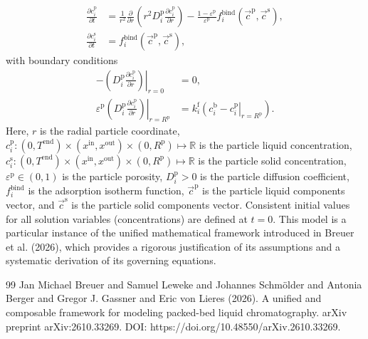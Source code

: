 \documentclass{article}
\begin{document}
\begin{align}
    \frac{\partial c^{\mathrm{p}}_{i}}{\partial t}
    &= \frac{1}{r^{2}} \frac{\partial }{\partial r} \left( r^{2} D^{\mathrm{p}}_{i} \frac{\partial c^{\mathrm{p}}_{i}}{\partial r} \right)
        - \frac{1 - \varepsilon^{\mathrm{p}}}{\varepsilon^{\mathrm{p}}}f^{\mathrm{bind}}_{i}\left( \vec{c}^{\mathrm{p}}, \vec{c}^{\mathrm{s}} \right),
    \\
    \frac{\partial c^{\mathrm{s}}_{i}}{\partial t}
    &= f^{\mathrm{bind}}_{i}\left( \vec{c}^{\mathrm{p}}, \vec{c}^{\mathrm{s}} \right),
\end{align}
with boundary conditions
\begin{align}
    - \left. \left( D^{\mathrm{p}}_{i} \frac{\partial c^{\mathrm{p}}_{i}}{\partial r} \right) \right|_{r=0}
    &= 0,
    \\
    \varepsilon^{\mathrm{p}} \left. \left( D^{\mathrm{p}}_{i} \frac{\partial c^{\mathrm{p}}_{i}}{\partial r} \right)\right|_{r = R^{\mathrm{p}}}
    &= k^{\mathrm{f}}_{i} \left. \left( c^{\mathrm{b}}_{i} - c^{\mathrm{p}}_{i} \right|_{r = R^{\mathrm{p}}} \right).
\end{align}
Here, $r$ is the radial particle coordinate, $c^{\mathrm{p}}_{i}\colon (0, T^{\mathrm{end}}) \times (x^{\mathrm{in}}, x^{\mathrm{out}})\times (0, R^{\mathrm{p}}) \mapsto \mathbb{R}$ is the particle liquid concentration, $c^{\mathrm{s}}_{i}\colon (0, T^{\mathrm{end}}) \times (x^{\mathrm{in}}, x^{\mathrm{out}})\times (0, R^{\mathrm{p}}) \mapsto \mathbb{R}$ is the particle solid concentration, $\varepsilon^{\mathrm{p}}\in (0, 1)$ is the particle porosity, $D^{\mathrm{p}}_{i}> 0$ is the particle diffusion coefficient, $f^{\mathrm{bind}}_{i}$ is the adsorption isotherm function, $\vec{c}^{\mathrm{p}}$ is the particle liquid components vector, and $\vec{c}^{\mathrm{s}}$ is the particle solid components vector.
Consistent initial values for all solution variables (concentrations) are defined at $t = 0$.
This model is a particular instance of the unified mathematical framework introduced in Breuer et al. (2026), which provides a rigorous justification of its assumptions and a systematic derivation of its governing equations.
\begin{thebibliography}{99}
     Jan Michael Breuer and Samuel Leweke and Johannes Schmölder and Antonia Berger and Gregor J. Gassner and Eric von Lieres (2026). A unified and composable framework for modeling packed-bed liquid chromatography. arXiv preprint arXiv:2610.33269. DOI: https://doi.org/10.48550/arXiv.2610.33269.
\end{thebibliography}
\end{document}
